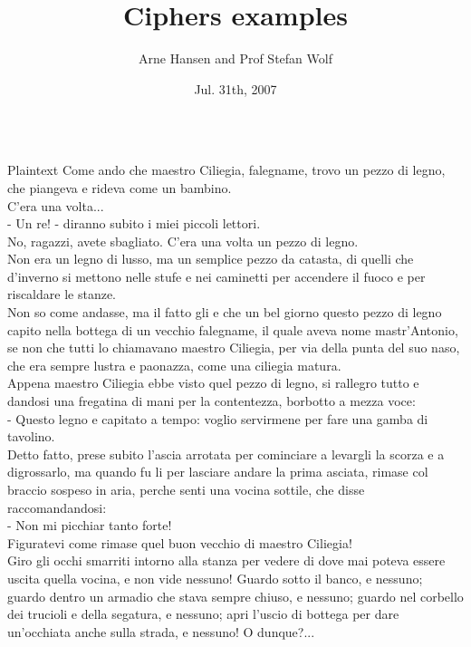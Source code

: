 \documentclass[final,hyperref={pdfpagelabels=false}]{beamer}
\title[Examples]{Ciphers examples}
\author[Hansen and Wolf]{Arne Hansen and Prof Stefan Wolf}
\institute[USI]{Cryptography and Quantum Information, USI Lugano}
\date{Jul. 31th, 2007}
\begin{document}
  \begin{frame}{} 
    \begin{columns}[t]
    \begin{column}{.2\linewidth}
      \begin{block}{Plaintext}
Come ando che maestro Ciliegia, falegname, trovo un pezzo di legno, che piangeva e rideva come un bambino.\\
C'era una volta...\\
- Un re! - diranno subito i miei piccoli lettori.\\
No, ragazzi, avete sbagliato. C'era una volta un pezzo di legno.\\
Non era un legno di lusso, ma un semplice pezzo da catasta, di quelli che d'inverno si mettono nelle stufe e nei caminetti per accendere il fuoco e per riscaldare le stanze.\\
Non so come andasse, ma il fatto gli e che un bel giorno questo pezzo di legno capito nella bottega di un vecchio falegname, il quale aveva nome mastr'Antonio, se non che tutti lo chiamavano maestro Ciliegia, per via della punta del suo naso, che era sempre lustra e paonazza, come una ciliegia matura.\\
Appena maestro Ciliegia ebbe visto quel pezzo di legno, si rallegro tutto e dandosi una fregatina di mani per la contentezza, borbotto a mezza voce:\\
- Questo legno e capitato a tempo: voglio servirmene per fare una gamba di tavolino.\\
Detto fatto, prese subito l'ascia arrotata per cominciare a levargli la scorza e a digrossarlo, ma quando fu li per lasciare andare la prima asciata, rimase col braccio sospeso in aria, perche senti una vocina sottile, che disse raccomandandosi:\\
- Non mi picchiar tanto forte!\\
Figuratevi come rimase quel buon vecchio di maestro Ciliegia!\\
Giro gli occhi smarriti intorno alla stanza per vedere di dove mai poteva essere uscita quella vocina, e non vide nessuno! Guardo sotto il banco, e nessuno; guardo dentro un armadio che stava sempre chiuso, e nessuno; guardo nel corbello dei trucioli e della segatura, e nessuno; apri l'uscio di bottega per dare un'occhiata anche sulla strada, e nessuno! O dunque?...\\

\end{block}
\end{column}
\end{columns}
\end{frame}
\end{document}
